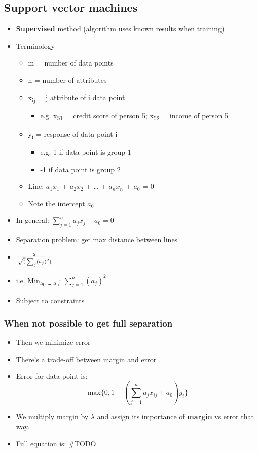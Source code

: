\documentclass[11pt]{article}
\begin{document}
\subsection{Support vector machines}
\label{sec:org08b1bc5}
\begin{itemize}
\item \textbf{Supervised} method (algorithm uses known results when training)
\item Terminology
\begin{itemize}
\item m = number of data points
\item n = number of attributes
\item x\textsubscript{ij} = j attribute of i data point
\begin{itemize}
\item e.g. x\textsubscript{51} = credit score of person 5; x\textsubscript{52} = income of person 5
\end{itemize}
\item y\textsubscript{i} = response of data point i
\begin{itemize}
\item e.g. 1 if data point is group 1
\item -1 if data point is group 2
\end{itemize}
\item Line: \(a_1 x_1\) + \(a_2 x_2\) + \ldots{} + \(a_n x_n\) + \(a_0\) = 0
\item Note the intercept \(a_0\)
\end{itemize}
\item In general: \(\sum_{j=1}^{n} a_j x_j + a_0 = 0\)
\item Separation problem: get max distance between lines
\item \(2\over{\sqrt(\sum_{j} \left(a_j\right)^2)}\)
\item i.e. Min\textsubscript{a\textsubscript{0} \ldots{} a\textsubscript{n}}: \(\sum_{j=1}^{n}\left(a_j\right)^2\)
\item Subject to constraints
\end{itemize}
\subsubsection{When not possible to get full separation}
\label{sec:org51eff26}
\begin{itemize}
\item Then we minimize error
\item There's a trade-off between margin and error
\item Error for data point is:
$$
  \text{max} \{ 0, 1-(\sum_{j=1}^{n} a_j x_{ij} + a_0) y_i \}
  $$
\item We multiply margin by \(\lambda\) and assign its importance of \textbf{\textbf{margin}} vs error that way.
\item Full equation is: \#TODO
\end{itemize}
\end{document}
